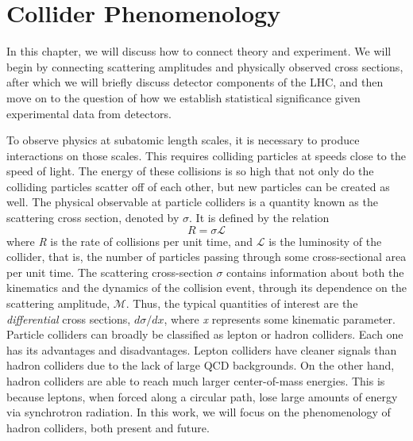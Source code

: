 \chapter{Collider Phenomenology}
In this chapter, we will discuss how to connect theory and experiment. We will begin by connecting scattering amplitudes and physically observed cross sections, after which we will briefly discuss detector components of the LHC, and then move on to the question of how we establish statistical significance given experimental data from detectors.

To observe physics at subatomic length scales, it is necessary to produce interactions on those scales. This requires colliding particles at speeds close to the speed of light. The energy of these collisions is so high that not only do the colliding particles scatter off of each other, but new particles can be created as well. 
The physical observable at particle colliders is a quantity known as the scattering cross section, denoted by $\sigma$. It is defined by the relation
\[R = \sigma\mathcal{L}\]
where \emph{R} is the rate of collisions per unit time, and $\mathcal{L}$ is the luminosity of the collider, that is, the number of particles passing through some cross-sectional area per unit time. The scattering cross-section $\sigma$ contains information about both the kinematics and the dynamics of the collision event, through its dependence on the scattering amplitude, $\mathcal{M}$. Thus, the typical quantities of interest are the \emph{differential} cross sections, $d\sigma/dx$, where \emph{x} represents some kinematic parameter. 
Particle colliders can broadly be classified as lepton or hadron colliders. Each one has its advantages and disadvantages. Lepton colliders have cleaner signals than hadron colliders due to the lack of large QCD backgrounds. On the other hand, hadron colliders are able to reach much larger center-of-mass energies. This is because leptons, when forced along a circular path, lose large amounts of energy via synchrotron radiation. In this work, we will focus on the phenomenology of hadron colliders, both present and future.
